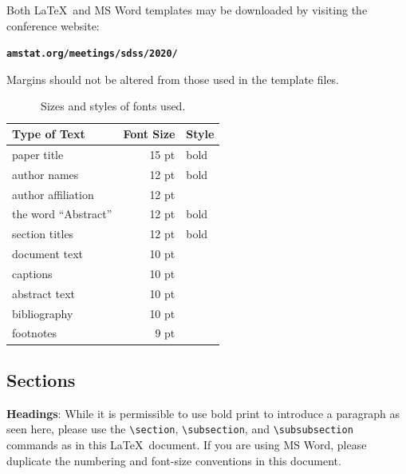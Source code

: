 \documentclass[10pt]{article}
\begin{document}
Both \LaTeX\ and 
MS Word templates may be downloaded by visiting the conference website:
\begin{center}
\textbf{\texttt{amstat.org/meetings/sdss/2020/}}
\end{center}
Margins should not be altered from those used in the template files.

\begin{table}[h]
\begin{center}
\begin{tabular}{|l|rl|}
\hline \bf Type of Text & \bf Font Size & \bf Style \\ \hline
paper title & 15 pt & bold \\
author names & 12 pt & bold \\
author affiliation & 12 pt & \\
the word ``Abstract'' & 12 pt & bold \\
section titles & 12 pt & bold \\
document text & 10 pt  &\\
captions & 10 pt & \\
abstract text & 10 pt & \\
bibliography & 10 pt & \\
footnotes & 9 pt & \\
\hline
\end{tabular}
\end{center}
\caption{\label{fontsizes} Sizes and styles of fonts used.}
\end{table}


\subsection{Sections}
\label{info-on-sections}

{\bf Headings}: While it is permissible to use bold print to introduce a paragraph
as seen here, please use the \verb+\section+,
\verb+\subsection+, and \verb+\subsubsection+
commands as in this \LaTeX\ document.  If you are using MS Word, please duplicate
the numbering and font-size conventions in this document.
\end{document}
